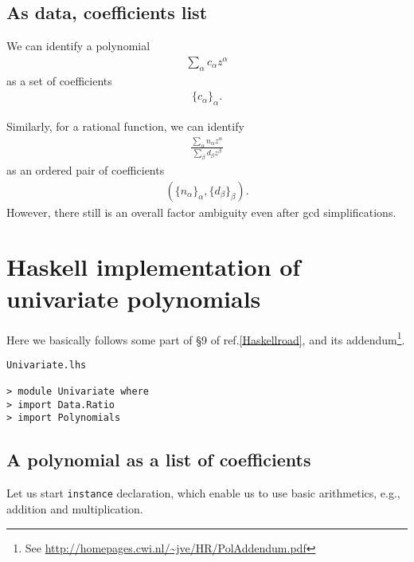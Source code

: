 \documentclass[11pt]{book}
\begin{document}
\subsection{As data, coefficients list}
We can identify a polynomial
\begin{eqnarray}
\sum_\alpha c_\alpha z^\alpha
\end{eqnarray}
as a set of coefficients
\begin{eqnarray}
\{ c_\alpha\}_{\alpha}.
\end{eqnarray}

Similarly, for a rational function, we can identify
\begin{eqnarray}
\frac{\sum_\alpha n_\alpha z^\alpha}{\sum_\beta d_\beta z^\beta}
\end{eqnarray}
as an ordered pair of coefficients
\begin{eqnarray}
(\{ n_\alpha\}_\alpha, \{ d_\beta\}_\beta).
\end{eqnarray}
However, there still is an overall factor ambiguity even after gcd simplifications.

\section{Haskell implementation of univariate polynomials}
Here we basically follows some part of \S9 of ref.\ref{Haskellroad}, and its addendum\footnote{
See \url{http://homepages.cwi.nl/~jve/HR/PolAddendum.pdf}
}.

\begin{verbatim}
Univariate.lhs

> module Univariate where
> import Data.Ratio
> import Polynomials 
\end{verbatim}

\subsection{A polynomial as a list of coefficients}
Let us start \texttt{instance} declaration, which enable us to use basic arithmetics, e.g., addition and multiplication.


\end{document}
